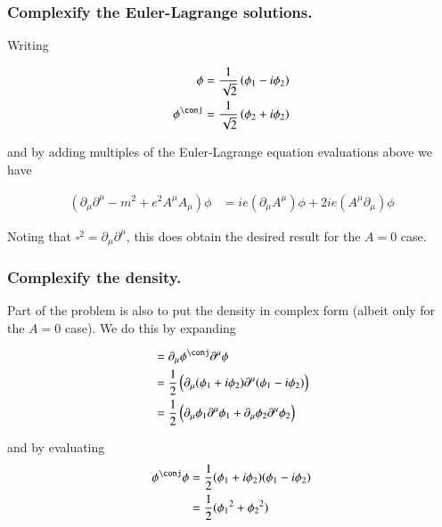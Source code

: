 %
\subsubsection{Complexify the Euler-Lagrange solutions. }

Writing

\begin{align*}
\phi &= \inv{\sqrt{2}}\left( \phi_1 - i \phi_2 \right) \\
\phi^\conj &= \inv{\sqrt{2}}\left( \phi_2 + i \phi_2 \right) \\
\end{align*}

and by adding multiples of the Euler-Lagrange equation evaluations above we have

\begin{align}\label{eqn:byron_fuller_calc_var:complexifiedSolution}
\left( \partial_\mu \partial^\mu -m^2 + e^2 A^\mu A_\mu \right) \phi &= i e (\partial_\mu A^\mu) \phi + 2 i e (A^\mu \partial_\mu) \phi 
\end{align}

Noting that $\square^2 = \partial_\mu \partial^\mu$, this does obtain the desired result for the $A=0$ case.

\subsubsection{Complexify the density. }

Part of the problem is also to put the density in complex form (albeit only for the $A=0$ case).  We do this by expanding

\begin{align*}
&= \partial_\mu \phi^\conj \partial^\mu \phi \\
&=
\inv{2} \left( \partial_\mu (\phi_1 + i \phi_2) \partial^\mu (\phi_1 - i \phi_2) \right) \\
&=
\inv{2} \left( \partial_\mu \phi_1 \partial^\mu \phi_1 + \partial_\mu \phi_2 \partial^\mu \phi_2 \right) \\
\end{align*}

and by evaluating
\begin{align*}
\phi^\conj \phi 
&= \inv{2} (\phi_1 + i \phi_2) (\phi_1 - i \phi_2) \\
&= \inv{2} ({\phi_1}^2 + {\phi_2}^2 )
\end{align*}

